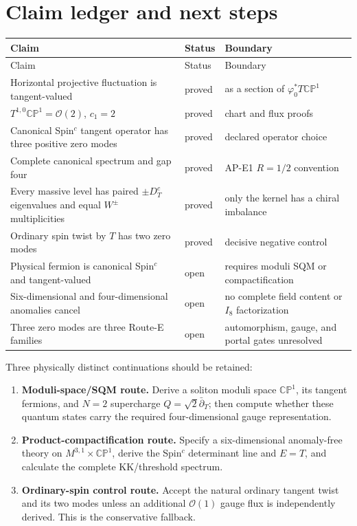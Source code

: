 \documentclass[11pt]{article}
\theoremstyle{definition}
\theoremstyle{remark}
\newcommand{\CP}{\mathbb {CP}}
\newcommand{\cO}{\mathcal O}
\newcommand{\status}[1]{\textcolor{blue!60!black}{\textsf{#1}}}
\begin{document}
\section{Claim ledger and next steps}

\begin{longtable}{@{}L{0.43\textwidth}L{0.20\textwidth}L{0.28\textwidth}@{}}
\toprule
Claim & Status & Boundary\\
\midrule
\endfirsthead
\toprule
Claim & Status & Boundary\\
\midrule
\endhead
Horizontal projective fluctuation is tangent-valued & \status{proved} & as a
section of \(\varphi_0^*T\CP^1\)\\
\(T^{1,0}\CP^1=\cO(2)\), \(c_1=2\) & \status{proved} & chart and flux proofs\\
Canonical Spin\({}^c\) tangent operator has three positive zero modes &
\status{proved} & declared operator choice\\
Complete canonical spectrum and gap four & \status{proved} & AP-E1
\(R=1/2\) convention\\
Every massive level has paired \(\pm D_T^c\) eigenvalues and equal
\(W^\pm\) multiplicities & \status{proved} & only the kernel has a chiral
imbalance\\
Ordinary spin twist by \(T\) has two zero modes & \status{proved} & decisive
negative control\\
Physical fermion is canonical Spin\({}^c\) and tangent-valued &
\status{open} & requires moduli SQM or compactification\\
Six-dimensional and four-dimensional anomalies cancel & \status{open} & no
complete field content or \(I_8\) factorization\\
Three zero modes are three Route-E families & \status{open} & automorphism,
gauge, and portal gates unresolved\\
\bottomrule
\end{longtable}

Three physically distinct continuations should be retained:
\begin{enumerate}
\item \textbf{Moduli-space/SQM route.}  Derive a soliton moduli space
  \(\CP^1\), its tangent fermions, and \(N=2\) supercharge
  \(Q=\sqrt2\bar\partial_T\); then compute whether these quantum states carry
  the required four-dimensional gauge representation.
\item \textbf{Product-compactification route.}  Specify a six-dimensional
  anomaly-free theory on \(M^{3,1}\times\CP^1\), derive the Spin\({}^c\)
  determinant line and \(E=T\), and calculate the complete KK/threshold
  spectrum.
\item \textbf{Ordinary-spin control route.}  Accept the natural ordinary
  tangent twist and its two modes unless an additional \(\cO(1)\) gauge flux
  is independently derived.  This is the conservative fallback.
\end{enumerate}
\end{document}
